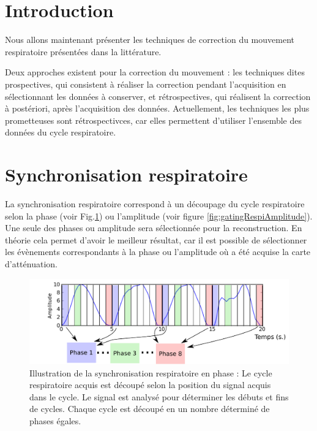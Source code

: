 \label{lab:corrMvt}

\section{Introduction}

Nous allons maintenant présenter les techniques de correction du mouvement respiratoire présentées dans la littérature. 

Deux approches existent pour la correction du mouvement : les techniques dites prospectives, qui consistent à réaliser la correction pendant l'acquisition en sélectionnant les données à conserver, et rétrospectives, qui réalisent la correction à postériori, après l'acquisition des données. Actuellement, les techniques les plus prometteuses sont rétrospectivces, car elles permettent d'utiliser l'ensemble des données du cycle respiratoire.

\section{Synchronisation respiratoire}

La synchronisation respiratoire correspond à un découpage du cycle respiratoire selon la phase (voir Fig.\ref{fig:gatingRespi}) ou l'amplitude (voir figure \ref{fig:gatingRespiAmplitude}). Une seule des phases ou amplitude sera sélectionnée pour la reconstruction. En théorie cela permet d'avoir le meilleur résultat, car il est possible de sélectionner les évènements correspondants à la phase ou l'amplitude où a été acquise la carte d'atténuation.


\begin{figure}[h!]
	\begin{center}
		\includegraphics[width=12cm]{images/ET-IM}
	\end{center}
	\caption{Illustration de la synchronisation respiratoire en phase : Le cycle respiratoire acquis est découpé selon la position du signal acquis dans le cycle. Le signal est analysé pour déterminer les débuts et fins de cycles. Chaque cycle est découpé en un nombre déterminé de phases égales.} 
	\label{fig:gatingRespi}
\end{figure}



